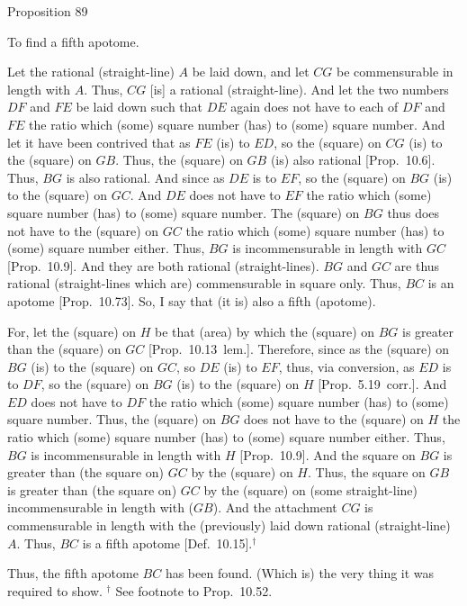 \begin{center}
{\large Proposition 89}
\end{center}

To find a fifth apotome.

\epsfysize=0.6in
\centerline{}

Let the rational (straight-line) $A$ be laid down, and let
$CG$ be commensurable in length with $A$. Thus, $CG$ [is] a rational
(straight-line). And let the two numbers $DF$ and $FE$ be laid
down such that $DE$ again does not have to each of $DF$ and $FE$
the ratio which (some) square number (has) to (some) square number. 
And let it have been contrived that as $FE$ (is) to $ED$, so the
(square) on $CG$ (is) to the (square) on $GB$. Thus, the (square) on
$GB$ (is) also rational [Prop.~10.6]. 
Thus, $BG$ is also rational.
And since as $DE$ is to $EF$, so the (square) on $BG$ (is) to
the (square) on $GC$. And $DE$ does not have to $EF$ the
ratio which (some) square number (has) to (some) square number.
The (square) on $BG$ thus does not have to the (square) on $GC$
the ratio which (some) square number (has) to (some) square number either.
Thus, $BG$ is incommensurable in length with $GC$ [Prop.~10.9]. And they are both rational (straight-lines). $BG$ and $GC$ are thus rational (straight-lines which are)
commensurable in square only. Thus, $BC$ is an apotome [Prop.~10.73]. So, I say that (it is) also a fifth
(apotome).

For, let the (square) on $H$ be that (area) by which the (square) on $BG$
is greater than the (square) on $GC$ [Prop.~10.13~lem.]. Therefore, since
as the (square) on $BG$ (is) to the (square) on $GC$, so $DE$  (is) to
$EF$, thus, via conversion, as $ED$ is to $DF$, so the (square)
on $BG$ (is) to the (square) on $H$ [Prop.~5.19~corr.]. And $ED$ does not have to
$DF$ the ratio which (some) square number (has) to (some) square number.
Thus, the (square) on $BG$ does not have to the (square) on $H$
the ratio which (some) square number (has) to (some) square number
either. Thus, $BG$ is incommensurable in length with $H$ [Prop.~10.9]. And the square on $BG$ is greater
than (the square on) $GC$ by the (square) on $H$.
Thus, the square on $GB$ is greater
than (the square on) $GC$ by the (square) on (some straight-line)
incommensurable in length with ($GB$). And the attachment $CG$ is
commensurable in length with the (previously) laid down rational (straight-line) $A$. Thus, $BC$ is a fifth apotome [Def.~10.15].$^\dag$

Thus, the fifth apotome $BC$ has been found. (Which is) the very thing it
was required to show.
{\footnotesize\noindent$^\dag$ See footnote to Prop.~10.52.}


